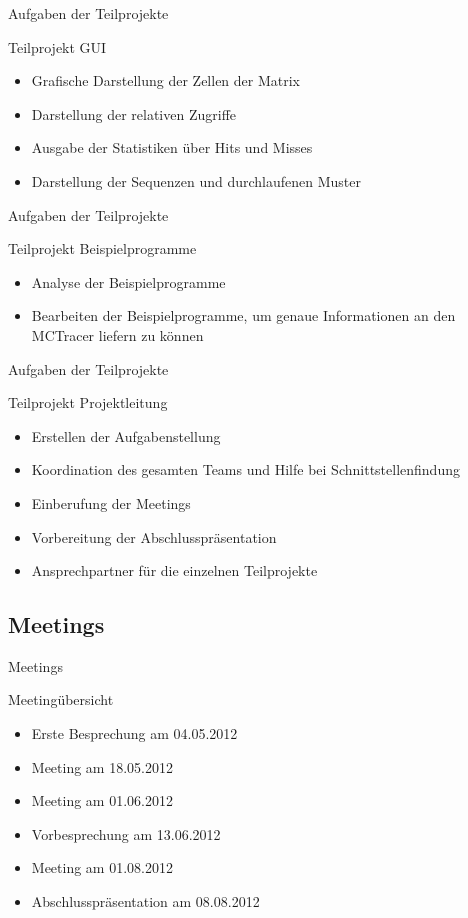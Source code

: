 \begin{frame}{Aufgaben der Teilprojekte}
\begin{block}{Teilprojekt GUI}
\begin{itemize}[<+->]
\pause\item Grafische Darstellung der Zellen der Matrix
\item Darstellung der relativen Zugriffe
\item Ausgabe der Statistiken über Hits und Misses
\item Darstellung der Sequenzen und durchlaufenen Muster
\end{itemize}
\end{block}
\end{frame}

\begin{frame}{Aufgaben der Teilprojekte}
\begin{block}{Teilprojekt Beispielprogramme}
\begin{itemize}[<+->]
\pause\item Analyse der Beispielprogramme
\item Bearbeiten der Beispielprogramme, um genaue Informationen an den MCTracer liefern zu können
\end{itemize}
\end{block}
\end{frame}

\begin{frame}{Aufgaben der Teilprojekte}
\begin{block}{Teilprojekt Projektleitung}
\begin{itemize}[<+->]
\pause\item Erstellen der Aufgabenstellung
\item Koordination des gesamten Teams und Hilfe bei Schnittstellenfindung
\item Einberufung der Meetings
\item Vorbereitung der Abschlusspräsentation
\item Ansprechpartner für die einzelnen Teilprojekte
\end{itemize}
\end{block}
\end{frame}

\subsection{Meetings}

\begin{frame}{Meetings}
\begin{block}{Meetingübersicht}
\begin{itemize}[<+->]
\pause\item Erste Besprechung am 04.05.2012
\item Meeting am 18.05.2012
\item Meeting am 01.06.2012
\item Vorbesprechung am 13.06.2012
\item Meeting am 01.08.2012
\item Abschlusspräsentation am 08.08.2012
\end{itemize}
\end{block}
\end{frame}

